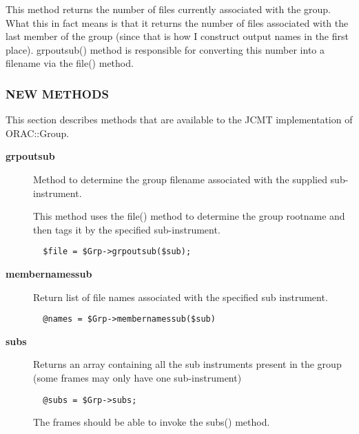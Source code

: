 \begin{description}
\begin{description}
This method returns the number of files currently associated
with the group. What this in fact means is that it returns
the number of files associated with the last member of the
group (since that is how I construct output names in the
first place). grpoutsub() method is responsible for
converting this number into a filename via the file() method.

\end{description}
\subsubsection*{NEW METHODS\label{ORAC::Group::JCMT_NEW_METHODS}}


This section describes methods that are available to the
JCMT implementation of ORAC::Group.

\begin{description}

\item[{\textbf{grpoutsub}}] \mbox{}

Method to determine the group filename associated with
the supplied sub-instrument.



This method uses the file() method to determine the
group rootname and then tags it by the specified sub-instrument.

\begin{verbatim}
  $file = $Grp->grpoutsub($sub);
\end{verbatim}

\item[{\textbf{membernamessub}}] \mbox{}

Return list of file names associated with the specified
sub instrument.

\begin{verbatim}
  @names = $Grp->membernamessub($sub)
\end{verbatim}

\item[{\textbf{subs}}] \mbox{}

Returns an array containing all the sub instruments present
in the group (some frames may only have one sub-instrument)

\begin{verbatim}
  @subs = $Grp->subs;
\end{verbatim}


The frames should be able to invoke the subs() method.

\end{description}

\end{description}
